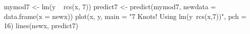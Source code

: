 \begin{Schunk}
\begin{Sinput}
 mymod7 <- lm(y ~ rcs(x, 7))
 predict7 <- predict(mymod7, newdata = data.frame(x = newx))
 plot(x, y, main = "7 Knots! Using lm(y~rcs(x,7))", pch = 16)
 lines(newx, predict7)
\end{Sinput}
\end{Schunk}
